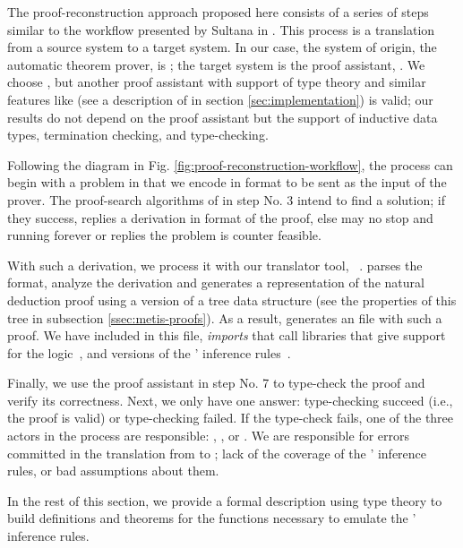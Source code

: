 \documentclass[../main.tex]{subfiles}
\begin{document}
The proof-reconstruction approach proposed here consists of a series
of steps similar to the workflow presented by Sultana in
\cite{sultana2015}. This process is a translation from a source
system to a target system. In our case, the system of origin, the
automatic theorem prover, is \Metis; the target system is the proof
assistant, \Agda. We choose \Agda, but another proof assistant with
support of type theory and similar features like \Agda
(see a description of \Agda in section
\ref{sec:implementation}) is valid; our results do not depend on 
the proof assistant but the support of inductive data types, 
termination checking, and type-checking.

Following the diagram in Fig.
\ref{fig:proof-reconstruction-workflow}, the process can begin with
a problem in \CPL that we encode in \TPTP format to be sent as the
input of the \Metis prover.
The proof-search algorithms of \Metis in step No. 3 intend to find 
a solution; if they success, \Metis replies a derivation in \TSTP 
format of the proof, else \Metis may no stop and running forever or 
replies the problem is counter feasible.

With such a derivation, we process it with our \Haskell translator
tool, \Athena~\cite{Athena}.
\Athena parses the \TSTP format, analyze the
derivation and generates a representation of the natural deduction
proof using a version of a tree data structure (see the properties
of this tree in subsection \ref{ssec:metis-proofs}). As a result,
\Athena generates an \Agda file with such a proof. We have included
in this file, \emph{imports} that call \Agda libraries that give 
support for the logic~\cite{AgdaProp}, and versions of the \Metis' 
inference rules~\cite{AgdaMetis}.

Finally, we use the proof assistant in step No. 7 to type-check the
proof and verify its correctness. Next, we only have one answer:
type-checking succeed (i.e., the proof is valid) or type-checking 
failed.
If the type-check fails, one of the three actors in the process are
responsible: \Metis, \Athena, or \Agda. We are responsible for
errors committed in the translation from \TSTP to \Agda; lack of the
coverage of the \Metis' inference rules, or bad assumptions about
them. 

In the rest of this section, we provide a formal description using
type theory to build definitions and theorems for the functions
necessary to emulate the \Metis' inference rules.

\end{document}

